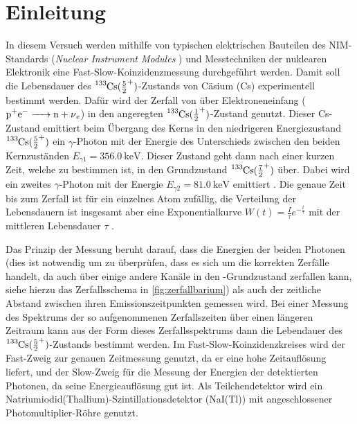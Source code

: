 \chapter{Einleitung}

In diesem Versuch werden mithilfe von typischen elektrischen Bauteilen des NIM-Standards (\textit{Nuclear Instrument Modules} \cite[257]{leotechniques}) und Messtechniken der nuklearen Elektronik eine Fast-Slow-Koinzidenzmessung durchgeführt werden. Damit soll die Lebensdauer des $\ce{^133Cs}(\frac{5}{2}^+)$-Zustands von Cäsium (Cs) experimentell bestimmt werden. Dafür wird der Zerfall von \ba über Elektroneneinfang ($\ce{p+e- -> n + \nu_e}$) in den angeregten $\ce{^133Cs}(\frac{1}{2}^+)$-Zustand genutzt. Dieser Cs-Zustand emittiert beim Übergang des Kerns in den niedrigeren Energiezustand $\ce{^133Cs}(\frac{5}{2}^+)$ ein $\gamma$-Photon mit der Energie des Unterschieds zwischen den beiden Kernzuständen $E_{\gamma1} = \SI{356.0}{\kilo\eV}$. Dieser Zustand geht dann nach einer kurzen Zeit, welche zu bestimmen ist, in den Grundzustand $\ce{^133Cs}(\frac{7}{2}^+)$ über. Dabei wird ein zweites $\gamma$-Photon mit der Energie $E_{\gamma2}=\SI{81.0}{\kilo\eV}$ emittiert \cite[Abbildung P525.6.1 (a)]{525va}. Die genaue Zeit bis zum Zerfall ist für ein einzelnes Atom zufällig, die Verteilung der Lebensdauern ist insgesamt aber eine Exponentialkurve $W(t)=\frac{I}{\tau}e^{-\frac{t}{\tau}}$ mit der mittleren Lebensdauer $\tau$ \cite[10]{525va}.

Das Prinzip der Messung beruht darauf, dass die Energien der beiden Photonen (dies ist notwendig um zu überprüfen, dass es sich um die korrekten Zerfälle handelt, da \ba  auch über einige andere Kanäle in den \caesium-Grundzustand zerfallen kann, siehe hierzu das Zerfallsschema in \ref{fig:zerfallbarium}) als auch der zeitliche Abstand zwischen ihren Emissionszeitpunkten gemessen wird. Bei einer Messung des Spektrums der so aufgenommenen Zerfallszeiten über einen längeren Zeitraum kann aus der Form dieses Zerfallsspektrums dann die Lebendauer des $\ce{^133Cs}(\frac{5}{2}^+)$-Zustands bestimmt werden. Im Fast-Slow-Koinzidenzkreises wird der Fast-Zweig zur genauen Zeitmessung genutzt, da er eine hohe Zeitauflösung liefert, und der Slow-Zweig für die Messung der Energien der detektierten Photonen, da seine Energieauflösung gut ist. Als Teilchendetektor wird ein Natriumiodid(Thallium)-Szintillationsdetektor (NaI(Tl)) mit angeschlossener Photomultiplier-Röhre genutzt.
